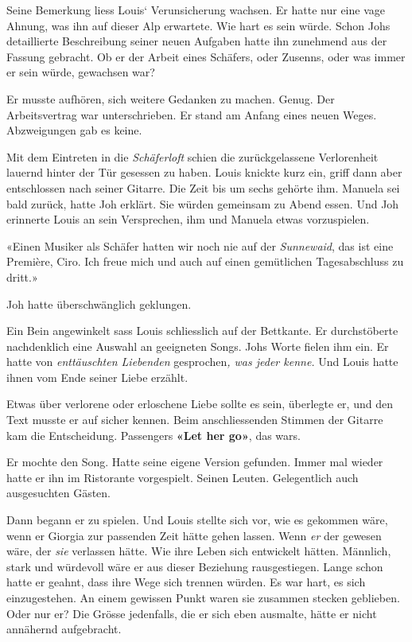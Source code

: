 Seine Bemerkung liess Louis` Verunsicherung wachsen. Er hatte nur eine
vage Ahnung, was ihn auf dieser Alp erwartete. Wie hart es sein würde.
Schon Johs detaillierte Beschreibung seiner neuen Aufgaben hatte ihn
zunehmend aus der Fassung gebracht. Ob er der Arbeit eines Schäfers,
oder Zusenns, oder was immer er sein würde, gewachsen war?

Er musste aufhören, sich weitere Gedanken zu machen. Genug. Der
Arbeitsvertrag war unterschrieben. Er stand am Anfang eines neuen Weges.
Abzweigungen gab es keine.

Mit dem Eintreten in die \emph{Schäferloft} schien die zurückgelassene
Verlorenheit lauernd hinter der Tür gesessen zu haben. Louis knickte
kurz ein, griff dann aber entschlossen nach seiner Gitarre. Die Zeit bis
um sechs gehörte ihm. Manuela sei bald zurück, hatte Joh erklärt. Sie
würden gemeinsam zu Abend essen. Und Joh erinnerte Louis an sein
Versprechen, ihm und Manuela etwas vorzuspielen.

«Einen Musiker als Schäfer hatten wir noch nie auf der \emph{Sunnewaid},
das ist eine Première, Ciro. Ich freue mich und auch auf einen
gemütlichen Tagesabschluss zu dritt.»

Joh hatte überschwänglich geklungen.

Ein Bein angewinkelt sass Louis schliesslich auf der Bettkante. Er
durchstöberte nachdenklich eine Auswahl an geeigneten Songs. Johs Worte
fielen ihm ein. Er hatte von \emph{enttäuschten Liebenden}
gesprochen\emph{, was jeder kenne.} Und Louis hatte ihnen vom Ende
seiner Liebe erzählt.

Etwas über verlorene oder erloschene Liebe sollte es sein, überlegte er,
und den Text musste er auf sicher kennen. Beim anschliessenden Stimmen
der Gitarre kam die Entscheidung. Passengers \textbf{«Let her go»}, das
wars.

Er mochte den Song. Hatte seine eigene Version gefunden. Immer mal
wieder hatte er ihn im Ristorante vorgespielt. Seinen Leuten.
Gelegentlich auch ausgesuchten Gästen.

Dann begann er zu spielen. Und Louis stellte sich vor, wie es gekommen
wäre, wenn er Giorgia zur passenden Zeit hätte gehen lassen. Wenn
\emph{er} der gewesen wäre, der \emph{sie} verlassen hätte. Wie ihre
Leben sich entwickelt hätten. Männlich, stark und würdevoll wäre er aus
dieser Beziehung rausgestiegen. Lange schon hatte er geahnt, dass ihre
Wege sich trennen würden. Es war hart, es sich einzugestehen. An einem
gewissen Punkt waren sie zusammen stecken geblieben. Oder nur er? Die
Grösse jedenfalls, die er sich eben ausmalte, hätte er nicht annähernd
aufgebracht.

